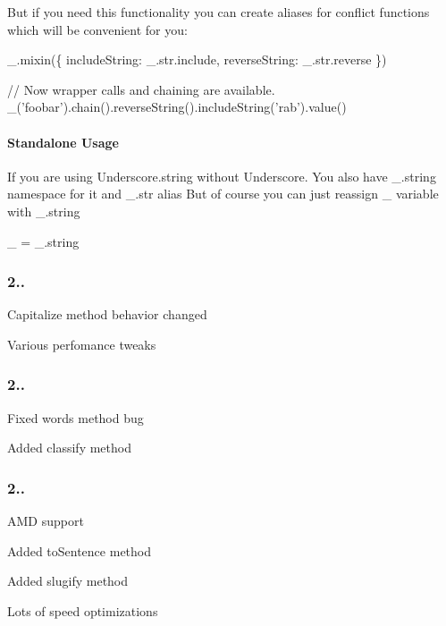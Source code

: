 But if you need this functionality you can create aliases for conflict functions which will be convenient for you\+:


\begin{DoxyCode}
\_.mixin(\{
    includeString: \_.str.include,
    reverseString: \_.str.reverse
\})

// Now wrapper calls and chaining are available.
\_('foobar').chain().reverseString().includeString('rab').value()
\end{DoxyCode}


\paragraph*{Standalone Usage}

If you are using Underscore.\+string without Underscore. You also have {\ttfamily \+\_\+.\+string} namespace for it and {\ttfamily \+\_\+.\+str} alias But of course you can just reassign {\ttfamily \+\_\+} variable with {\ttfamily \+\_\+.\+string}


\begin{DoxyCode}
\_ = \_.string
\end{DoxyCode}
 \subsubsection*{2..}


\begin{DoxyItemize}
\item Capitalize method behavior changed
\item Various perfomance tweaks
\end{DoxyItemize}

\subsubsection*{2..}


\begin{DoxyItemize}
\item Fixed words method bug
\item Added classify method
\end{DoxyItemize}

\subsubsection*{2..}


\begin{DoxyItemize}
\item A\+MD support
\item Added to\+Sentence method
\item Added slugify method
\item Lots of speed optimizations
\end{DoxyItemize}

